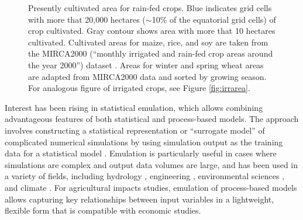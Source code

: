 \documentclass[preprint, 5p, times, twocolumn]{elsarticle}
\begin{document}
\begin{figure}[!ht]
   \caption{Presently cultivated area for rain-fed crops. Blue indicates grid cells with more that 20,000 hectares ($\sim$10\% of the equatorial grid cells) of crop cultivated. Gray contour shows area with more that 10 hectares cultivated. Cultivated areas for maize, rice, and soy are taken from the MIRCA2000 (``monthly irrigated and rain-fed crop areas around the year 2000'') dataset \citep{Portmann2010}. Areas for winter and spring wheat areas are adapted from MIRCA2000 data and sorted by growing season. For analogous figure of irrigated crops, see Figure \ref{fig:irrarea}.}
   \label{fig:crop_area}
\end{figure}

Interest has been rising in statistical emulation, which allows combining advantageous features of both statistical and process-based models. The approach involves constructing a statistical representation or ``surrogate model'' of complicated numerical simulations by using simulation output as the training data for a statistical model \citep[e.g.][]{OHAGAN2006, OHAGAN2010}. Emulation is particularly useful in cases where simulations are complex and output data volumes are large,  and  has been used in a variety of fields, including hydrology \citep[e.g.][]{Razavi2012}, engineering \citep[e.g.][]{STORLIE2009}, environmental sciences \citep[e.g.][]{RATTO2012}, and climate \citep[e.g.][]{Castruccio14, Holden2014}. For agricultural impacts studies, emulation of process-based models allows capturing key relationships between input variables in a lightweight, flexible form that is compatible with economic studies. 
\end{document}
